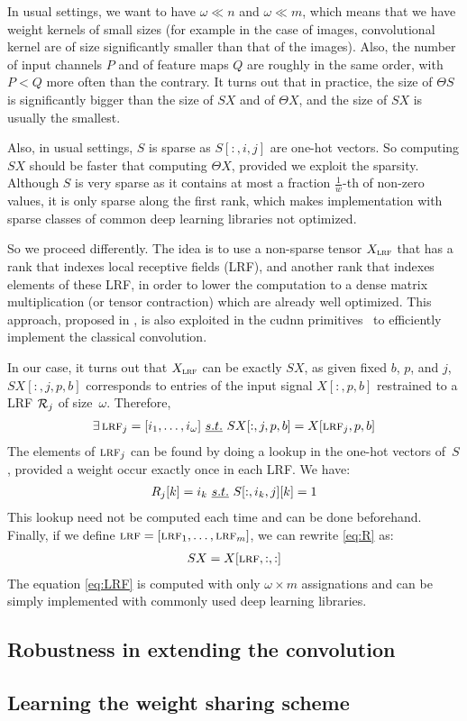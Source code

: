 In usual settings, we want to have $\omega \ll n$ and $\omega \ll m$, which means that we have weight kernels of small sizes (for example in the case of images, convolutional kernel are of size significantly smaller than that of the images). Also, the number of input channels $P$ and of feature maps $Q$ are roughly in the same order, with $P < Q$ more often than the contrary. It turns out that in practice, the size of $\Theta S$ is significantly bigger than the size of $SX$ and of $\Theta X$, and the size of $SX$ is usually the smallest.

Also, in usual settings, $S$ is sparse as $S[:,i,j]$ are one-hot vectors. So computing $SX$ should be faster that computing $\Theta X$, provided we exploit the sparsity. Although $S$ is very sparse as it contains at most a fraction $\frac{1}{w}$-th of non-zero values, it is only sparse along the first rank, which makes implementation with sparse classes of common deep learning libraries not optimized. 

So we proceed differently. The idea is to use a non-sparse tensor $X_{\operatorname{\textsc{lrf}}}$ that has a rank that indexes local receptive fields (LRF), and another rank that indexes elements of these LRF, in order to lower the computation to a dense matrix multiplication (or tensor contraction) which are already well optimized. This approach, proposed in \cite{chellapilla2006high}, is also exploited in the cudnn primitives~\citep{chetlur2014cudnn} to efficiently implement the classical convolution.

In our case, it turns out that $X_{\operatorname{\textsc{lrf}}}$ can be exactly $SX$, as given fixed $b$, $p$, and $j$, $SX[:,j,p,b]$ corresponds to entries of the input signal $X[:,p,b]$ restrained to a LRF $\mathcal{R}_j$ of size~$\omega$. Therefore,
\begin{gather}
\exists \operatorname{\textsc{lrf}}_j = [i_1, \ldots, i_\omega]~\emph{s.t.}~ SX[:,j,p,b] = X[\operatorname{\textsc{lrf}}_j, p, b]
\label{eq:R}
\end{gather}
The elements of $\operatorname{\textsc{lrf}}_j$ can be found by doing a lookup in the one-hot vectors of~$S$, provided a weight occur exactly once in each LRF. We have:
\begin{gather}
R_j[k] = i_k~\emph{s.t.}~ S[:,i_k,j][k] = 1
\end{gather}
This lookup need not be computed each time and can be done beforehand. Finally, if we define $\operatorname{\textsc{lrf}} = [\operatorname{\textsc{lrf}}_1, \ldots, \operatorname{\textsc{lrf}}_m]$, we can rewrite \eqref{eq:R} as:
\begin{gather}
SX = X[\operatorname{\textsc{lrf}}, :, :]
\label{eq:LRF}
\end{gather}
The equation \eqref{eq:LRF} is computed with only $\omega \times m$ assignations and can be simply implemented with commonly used deep learning libraries.


\subsection{Robustness in extending the convolution}

\subsection{Learning the weight sharing scheme}

